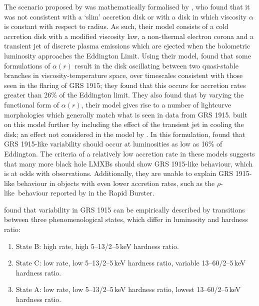\par The scenario proposed by \citet{Belloni_Model1} was mathematically formalised by \citet{Nayakshin_GRSModel}, who found that it was not consistent with a `slim' accretion disk \citep{Abramowicz_Slim} or with a disk in which viscosity $\alpha$ is constant with respect to radius.  As such, their model consists of a cold accretion disk with a modified viscosity law, a non-thermal electron corona and a transient jet of discrete plasma emissions which are ejected when the bolometric luminosity approaches the Eddington Limit.  Using their model, \citet{Nayakshin_GRSModel} found that some formulations of $\alpha(r)$ result in the disk oscillating between two quasi-stable branches in viscosity-temperature space, over timescales consistent with those seen in the flaring of GRS 1915; they found that this occurs for accretion rates greater than 26\% of the Eddington limit.  They also found that by varying the functional form of $\alpha(r)$, their model gives rise to a number of lightcurve morphologies which generally match what is seen in data from GRS 1915.  \citet{Janiuk_RadInstab} built on this model further by including the effect of the transient jet in cooling the disk; an effect not considered in the model by \citet{Nayakshin_GRSModel}.  In this formulation, \citet{Janiuk_RadInstab} found that GRS 1915-like variability should occur at luminosities as low as 16\% of Eddington.  The criteria of a relatively low accretion rate in these models suggests that many more black hole LMXBs should show GRS 1915-like behaviour, which is at odds with observations.  Additionally, they are unable to explain GRS 1915-like behaviour in objects with even lower accretion rates, such as the $\rho$-like\indexrho\ behaviour reported by \citet{Bagnoli_RB} in the Rapid Burster.
\par \citet{Belloni_GRS_MI} found that variability in GRS 1915 can be empirically described by transitions between three phenomenological states, which differ in luminosity and hardness ratio:
\begin{enumerate}
\item State B: high rate, high 5--13/2--5\,keV hardness ratio.
\item State C: low rate, low 5--13/2--5\,keV hardness ratio, variable 13--60/2--5\,keV hardness ratio.
\item State A: low rate, low 5--13/2--5\,keV hardness ratio, lowest 13--60/2--5\,keV hardness ratio.
\end{enumerate}
